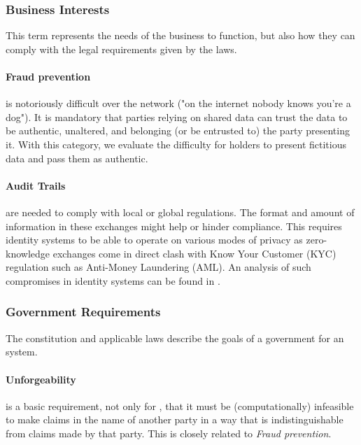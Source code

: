 \subsubsection{Business Interests} 

This term represents the needs of the business to function, but also how they can comply with the legal requirements given by the laws.

\paragraph{Fraud prevention} is notoriously difficult over the network ("on the internet nobody knows you're a dog"). 
It is mandatory that parties relying on shared data can trust the data to be authentic, unaltered, and belonging (or be entrusted to) the party presenting it. With this category, we evaluate the difficulty for holders to present fictitious data and pass them as authentic.

\paragraph{Audit Trails} are needed to comply with local or global regulations.
The format and amount of information in these exchanges might help or hinder compliance.
This requires identity systems to be able to operate on various modes of privacy as zero-knowledge exchanges come in direct clash with Know Your Customer (KYC) regulation such as Anti-Money Laundering (AML). An analysis of such compromises in identity systems can be found in \cite{ABCD25}.

\subsubsection{Government Requirements} 

The constitution and applicable laws describe the goals of a government for an \eid system.

\paragraph{Unforgeability} is a basic requirement, not only for \eid{}, that it must be (computationally) infeasible to make claims in the name of another party in a way that is indistinguishable from claims made by that party. This is closely related to \emph{Fraud prevention}.

